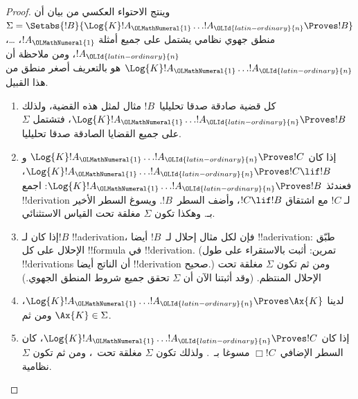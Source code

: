 \documentclass[../../../include/open-logic-section]{subfiles}
\begin{document}
\begin{proof}
  وينتج الاحتواء العكسي من بيان أن
  $\Sigma = \Setabs{!B}{\Log{K} !A_{\OLMathNumeral{1}} \dots !A_{\OLId{latin-ordinary}{n}} \Proves !B }$ منطق جهوي
  نظامي يشتمل على جميع أمثلة $!A_{\OLMathNumeral{1}}$، \dots، $!A_{\OLId{latin-ordinary}{n}}$، ومن ملاحظة أن
  $\Log{K} !A_{\OLMathNumeral{1}} \dots !A_{\OLId{latin-ordinary}{n}}$ هو بالتعريف أصغر منطق من هذا القبيل.
  \begin{enumerate}
    \item كل قضية صادقة صدقا تحليليا~$!B$ مثال لمثل هذه القضية، ولذلك
      $\Log{K}!A_{\OLMathNumeral{1}}\dots!A_{\OLId{latin-ordinary}{n}} \Proves !B$، فتشتمل $\Sigma$ على جميع
      القضايا الصادقة صدقا تحليليا.
    \item إذا كان $\Log{K}!A_{\OLMathNumeral{1}}\dots!A_{\OLId{latin-ordinary}{n}} \Proves !C$ و
      $\Log{K}!A_{\OLMathNumeral{1}}\dots!A_{\OLId{latin-ordinary}{n}} \Proves !C \lif !B$، فعندئذ
      $\Log{K}!A_{\OLMathNumeral{1}}\dots!A_{\OLId{latin-ordinary}{n}} \Proves !B$: اجمع !!{derivation} لـ
      $!C$ مع اشتقاق $!C \lif !B$، وأضف السطر~$!B$. ويسوغ السطر
      الأخير بـ\MP{}. وهكذا تكون $\Sigma$ مغلقة تحت القياس الاستثنائي.
    \item إذا كان لـ$!B$ !!a{derivation}، فإن لكل مثال إحلال لـ~$!B$
      أيضا !!a{derivation}: طبّق الإحلال على كل !!{formula} في
      !!{derivation}. (تمرين: أثبت بالاستقراء على طول !!{derivation}s
      أن الناتج أيضا !!{derivation} صحيح.) ومن ثم تكون $\Sigma$
      مغلقة تحت الإحلال المنتظم. (وقد أثبتنا الآن أن $\Sigma$ تحقق
      جميع شروط المنطق الجهوي.)
    \item لدينا $\Log{K}!A_{\OLMathNumeral{1}}\dots!A_{\OLId{latin-ordinary}{n}} \Proves \Ax{K}$، ومن ثم
      $\Ax{K} \in \Sigma$.
    \item إذا كان $\Log{K}!A_{\OLMathNumeral{1}}\dots!A_{\OLId{latin-ordinary}{n}} \Proves !C$، كان السطر
      الإضافي~$\Box !C$ مسوغا بـ~\Nec. ولذلك تكون $\Sigma$ مغلقة
      تحت~\Nec، ومن ثم تكون $\Sigma$ نظامية.
  \end{enumerate}
\end{proof}
\end{document}
